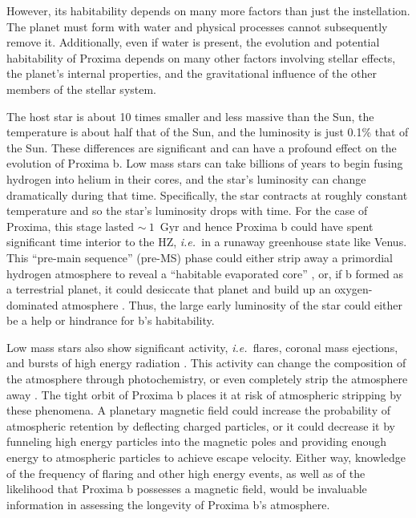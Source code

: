 \documentclass[preprint,12pt]{aastex}
\newcommand{\xxx}[1]{{\color{red} #1}} %
\def\eg{{\it e.g.\ }}
\def\ie{{\it i.e.\ }}
\begin{document}
However, its habitability depends on many more factors than just the
instellation. The planet must form with water and physical processes
cannot subsequently remove it. Additionally, even if water is present,
the evolution \xxx{and potential habitability} of Proxima depends on many other factors involving
stellar effects, the planet's internal properties, and the
gravitational influence of the other members of the stellar system.

The host star is about 10 times smaller and less massive than the Sun,
the temperature is about half that of the Sun, and the luminosity is
just 0.1\% that of the Sun. These differences are significant and can
have a profound effect on the evolution of Proxima b. Low mass stars
can take billions of years to begin fusing hydrogen into helium in
their cores, and the star's luminosity can change \xxx{dramatically} during that
time. Specifically, the star contracts at roughly constant temperature and so
the star's luminosity drops with time. For the case of Proxima, this
stage lasted $\sim~1$~Gyr \citep{Baraffe15} and hence Proxima b
could have spent significant time interior to the HZ, \ie in a runaway
greenhouse state like Venus. This ``pre-main sequence'' (pre-MS) phase could
either strip away a primordial hydrogen atmosphere to reveal a
``habitable evaporated core'' \citep{Luger15}, or, if b formed as a
terrestrial planet, it could desiccate that planet and build up an
oxygen-dominated atmosphere \citep{LugerBarnes15}. Thus, the large
early luminosity of the star could either be a help or hindrance for
b's habitability.

Low mass stars also show significant activity, \ie flares, coronal
mass ejections, and bursts of high energy radiation
\citep[\eg][]{West08}. This activity can change the composition of the
atmosphere through photochemistry, or even completely strip the
atmosphere away \citep{Raymond06}. The tight orbit of Proxima b places
it at risk of atmospheric stripping by these phenomena. A planetary
magnetic field could increase the probability of atmospheric retention
by deflecting charged particles, or it could decrease it by funneling
high energy particles into the magnetic poles and providing enough
energy to atmospheric particles to achieve escape velocity. Either
way, knowledge of the frequency of flaring and other high energy
events, as well as of the likelihood that Proxima b possesses a
magnetic field, would be invaluable information in assessing the
longevity of Proxima b's atmosphere.
\end{document}
